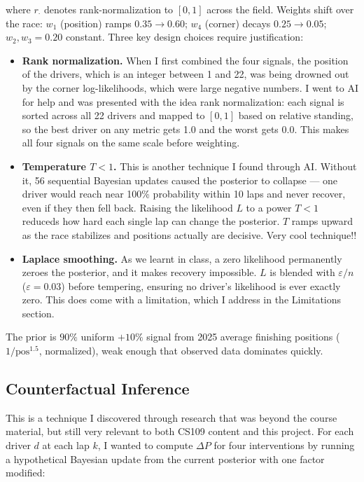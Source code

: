 \documentclass[10pt,twocolumn]{article}
\begin{document}
where $r_{\cdot}$ denotes rank-normalization to $[0,1]$ across the field.
Weights shift over the race: $w_1$ (position) ramps $0.35 \to 0.60$; $w_4$
(corner) decays $0.25 \to 0.05$; $w_2, w_3 = 0.20$ constant. Three key design
choices require justification:

\begin{itemize}
\item \textbf{Rank normalization.} When I first combined the four signals, the position of the drivers, which is an integer between 1 and 22, was being drowned out by the corner log-likelihoods, which were large negative numbers. I went to AI for help and was presented with the idea rank normalization: each signal is sorted across all 22 drivers and mapped to $[0,1]$ based on relative standing, so the best driver on any metric gets 1.0 and the worst gets 0.0. This makes all four signals on the same scale before weighting.

\item \textbf{Temperature $T < 1$.} This is another technique I found through AI. Without it, 56 sequential Bayesian updates caused the posterior to collapse --- one driver would reach near 100\% probability within 10 laps and never recover, even if they then fell back. Raising the likelihood $L$ to a power $T < 1$ reduceds how hard each single lap can change the posterior. $T$ ramps upward as the race stabilizes and positions actually are decisive. Very cool technique!!

\item \textbf{Laplace smoothing.} As we learnt in class, a zero likelihood permanently zeroes the posterior, and it makes recovery impossible. $L$ is blended with $\varepsilon/n$ ($\varepsilon = 0.03$) before tempering, ensuring no driver's likelihood is ever exactly zero. This does come with a limitation, which I address in the Limitations section.
\end{itemize}

The prior is $90\%$ uniform $+ 10\%$ signal from 2025 average finishing
positions ($1/\text{pos}^{1.5}$, normalized), weak enough that observed data
dominates quickly.

\subsection{Counterfactual Inference}

This is a technique I discovered through research that was beyond the course material, but still very relevant to both CS109 content and this project. For each driver $d$ at each lap $k$, I wanted to compute $\Delta P$ for four interventions by running a hypothetical Bayesian update from the current posterior with one factor modified:
\end{document}
